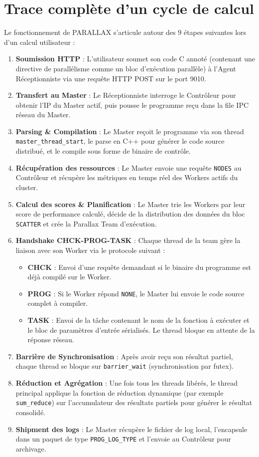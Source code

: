 \documentclass[12pt,a4paper]{report}
\begin{document}
\section{Trace complète d'un cycle de calcul}

Le fonctionnement de PARALLAX s'articule autour des 9 étapes suivantes lors d'un calcul utilisateur :

\begin{enumerate}
    \item \textbf{Soumission HTTP} : L'utilisateur soumet son code C annoté (contenant une directive de parallélisme comme un bloc d'exécution parallèle) à l'Agent Réceptionniste via une requête HTTP POST sur le port 9010.
    \item \textbf{Transfert au Master} : Le Réceptionniste interroge le Contrôleur pour obtenir l'IP du Master actif, puis pousse le programme reçu dans la file IPC réseau du Master.
    \item \textbf{Parsing \& Compilation} : Le Master reçoit le programme via son thread \texttt{master\_thread\_start}, le parse en C++ pour générer le code source distribué, et le compile sous forme de binaire de contrôle.
    \item \textbf{Récupération des ressources} : Le Master envoie une requête \texttt{NODES} au Contrôleur et récupère les métriques en temps réel des Workers actifs du cluster.
    \item \textbf{Calcul des scores \& Planification} : Le Master trie les Workers par leur score de performance calculé, décide de la distribution des données du bloc \texttt{SCATTER} et crée la Parallax Team d'exécution.
    \item \textbf{Handshake CHCK-PROG-TASK} : Chaque thread de la team gère la liaison avec son Worker via le protocole suivant :
        \begin{itemize}
            \item \textbf{CHCK} : Envoi d'une requête demandant si le binaire du programme est déjà compilé sur le Worker.
            \item \textbf{PROG} : Si le Worker répond \texttt{NONE}, le Master lui envoie le code source complet à compiler.
            \item \textbf{TASK} : Envoi de la tâche contenant le nom de la fonction à exécuter et le bloc de paramètres d'entrée sérialisés. Le thread bloque en attente de la réponse réseau.
        \end{itemize}
    \item \textbf{Barrière de Synchronisation} : Après avoir reçu son résultat partiel, chaque thread se bloque sur \texttt{barrier\_wait} (synchronisation par futex).
    \item \textbf{Réduction et Agrégation} : Une fois tous les threads libérés, le thread principal applique la fonction de réduction dynamique (par exemple \texttt{sum\_reduce}) sur l'accumulateur des résultats partiels pour générer le résultat consolidé.
    \item \textbf{Shipment des logs} : Le Master récupère le fichier de log local, l'encapsule dans un paquet de type \texttt{PROG\_LOG\_TYPE} et l'envoie au Contrôleur pour archivage.
\end{enumerate}
\end{document}
